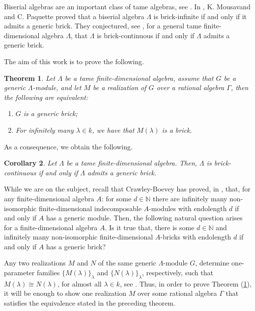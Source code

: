 \documentclass{article}
\newtheorem{theorem}{Theorem}[section]
\newtheorem{corollary}[theorem]{Corollary}
\theoremstyle{definition}
\newcommand{\hueca}[1]{\mathbb{#1}}
\begin{document}
Biserial algebras are an important class of tame algebras, see \cite{CB4}.  
In \cite{MP2}, K. Mousavand and C. Paquette  proved  that  a biserial algebra $\Lambda$ is  brick-infinite if and only if it admits a generic brick. 
They conjectured, see \cite[(4.1)]{MP2}, for a  general tame finite-dimensional  algebra  $\Lambda$, 
that $\Lambda$ is brick-continuous if and only if  $\Lambda$ admits a generic brick. 




The aim of this work is to prove the following.
\medskip


\begin{theorem}\label{T: gen-bricks vs bricks} Let $\Lambda$ be a tame finite-dimensional  algebra,  
assume that $G$ be a generic $\Lambda$-module, and let $M$ be  a realization of $G$ over a rational algebra $\Gamma$, then the following are equivalent:
\begin{enumerate}
\item $G$ is a generic brick; 
\item  For infinitely many $\lambda\in k$, we have 
that $M(\lambda)$  is a brick.  
\end{enumerate}
\end{theorem}

As a consequence, we obtain the following. 

\begin{corollary}\label{C: tame conj M-P} Let $\Lambda$ be a tame finite-dimensional algebra. Then, $\Lambda$ is brick-continuous if and only if $\Lambda$  admits a generic brick. 
\end{corollary}

While we are on the subject, recall that Crawley-Boevey has proved, in \cite[(9.5)]{CB3}, that, for any finite-dimensional algebra $A$:  for some $d\in \hueca{N}$  there are infinitely many non-isomorphic finite-dimensional indecomposable $A$-modules with endolength $d$ if and only if $A$ has a generic module. Then, the following natural question arises for a finite-dimensional algebra $A$. Is it true that,  there is some   $d\in \hueca{N}$ and infinitely many non-isomorphic finite-dimensional $A$-bricks  with endolength $d$ if and only if $A$ has a generic brick?

Any two realizations $M$ and $N$ of the same generic $\Lambda$-module $G$, determine one-parameter families $\{M(\lambda)\}_\lambda$ and  $\{N(\lambda)\}_\lambda$, respectively, such that $M(\lambda)\cong N(\lambda)$, for almost all $\lambda\in k$, see \cite[(5.2)]{CB2}. Thus, in order to prove Theorem (\ref{T: gen-bricks vs bricks}), 
it will be enough to show one realization $M$ over some rational algebra $\Gamma$ that  satisfies the  equivalence stated in the preceding theorem.  
\end{document}
